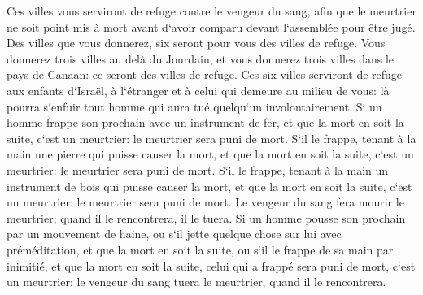 \verse Ces villes vous serviront de refuge contre le vengeur du sang, afin que le meurtrier ne soit point mis à mort avant d`avoir comparu devant l`assemblée pour être jugé. 
\verse Des villes que vous donnerez, six seront pour vous des villes de refuge. 
\verse Vous donnerez trois villes au delà du Jourdain, et vous donnerez trois villes dans le pays de Canaan: ce seront des villes de refuge. 
\verse Ces six villes serviront de refuge aux enfants d`Israël, à l`étranger et à celui qui demeure au milieu de vous: là pourra s`enfuir tout homme qui aura tué quelqu`un involontairement. 
\verse Si un homme frappe son prochain avec un instrument de fer, et que la mort en soit la suite, c`est un meurtrier: le meurtrier sera puni de mort. 
\verse S`il le frappe, tenant à la main une pierre qui puisse causer la mort, et que la mort en soit la suite, c`est un meurtrier: le meurtrier sera puni de mort. 
\verse S`il le frappe, tenant à la main un instrument de bois qui puisse causer la mort, et que la mort en soit la suite, c`est un meurtrier: le meurtrier sera puni de mort. 
\verse Le vengeur du sang fera mourir le meurtrier; quand il le rencontrera, il le tuera. 
\verse Si un homme pousse son prochain par un mouvement de haine, ou s`il jette quelque chose sur lui avec préméditation, et que la mort en soit la suite, 
\verse ou s`il le frappe de sa main par inimitié, et que la mort en soit la suite, celui qui a frappé sera puni de mort, c`est un meurtrier: le vengeur du sang tuera le meurtrier, quand il le rencontrera. 
